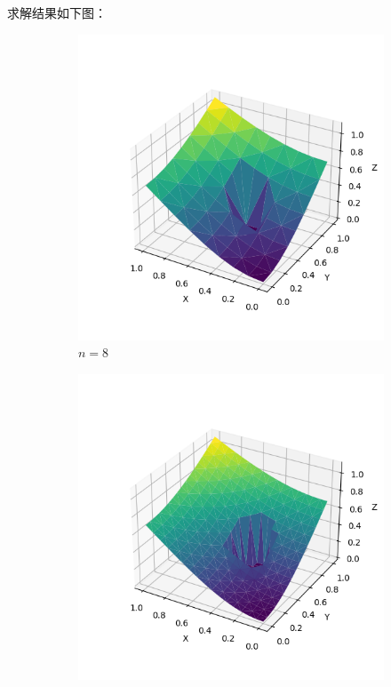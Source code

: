 \documentclass[lang=cn,a4paper,newtx,bibend=bibtex]{elegantpaper}
\begin{document}
求解结果如下图：

\begin{figure}[H]
  \centering
  \begin{subfigure}[b]{0.18\textwidth}
      \includegraphics[width=\textwidth]{../../res_bac/res-[data|3-mixed-irregular-a8].png}
      \caption{$n =  8$}
  \end{subfigure}
  \hfill
  \begin{subfigure}[b]{0.18\textwidth}
      \includegraphics[width=\textwidth]{../../res_bac/res-[data|3-mixed-irregular-b16].png}

\end{subfigure}
\end{figure}
\end{document}
